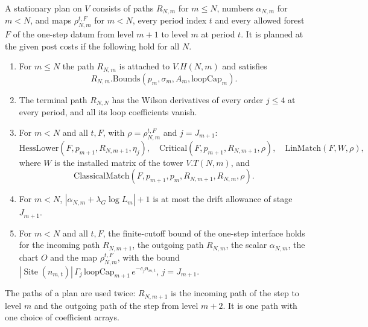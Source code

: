 \begin{definition}
\label{def:path-plan}
A stationary plan on $V$ consists of paths $R_{N,m}$ for $m\le N$,
numbers $\alpha_{N,m}$ for $m<N$, and maps $\rho_{N,m}^{t,F}$ for
$m<N$, every period index $t$ and every allowed forest $F$ of the
one-step datum from level $m+1$ to level $m$ at period $t$. It is
planned at the given post costs if the following hold for all $N$.
\begin{enumerate}
\item For $m\le N$ the path $R_{N,m}$ is attached to $V.H(N,m)$ and
 satisfies
 \[
 R_{N,m}.\mathrm{Bounds}(p_m,\sigma_m,A_m,\mathrm{loopCap}_m).
 \]
\item The terminal path $R_{N,N}$ has the Wilson derivatives of every
 order $j\le4$ at every period, and all its loop coefficients vanish.
\item For $m<N$ and all $t,F$, with $\rho=\rho_{N,m}^{t,F}$ and
 $j=J_{m+1}$:
 \[
 \mathrm{HessLower}(F,p_{m+1},R_{N,m+1},\eta_j),\quad
 \mathrm{Critical}(F,p_{m+1},R_{N,m+1},\rho),\quad
 \mathrm{LinMatch}(F,W,\rho),
 \]
 where $W$ is the installed matrix of the tower $V.T(N,m)$, and
 \[
 \mathrm{ClassicalMatch}(F,p_{m+1},p_m,R_{N,m+1},R_{N,m},\rho).
 \]
\item For $m<N$, $|\alpha_{N,m}+\lambda_G\log L_m|+1$ is at most the
 drift allowance of stage $J_{m+1}$.
\item For $m<N$ and all $t,F$, the finite-cutoff bound of the one-step
 interface holds for the incoming path $R_{N,m+1}$, the outgoing path
 $R_{N,m}$, the scalar $\alpha_{N,m}$, the chart $O$ and the map
 $\rho_{N,m}^{t,F}$, with the bound
 $|\operatorname{Site}(n_{m,t})|\,\Gamma_j\,\mathrm{loopCap}_{m+1}
 \,e^{-c_jn_{m,t}}$, $j=J_{m+1}$.
\end{enumerate}
\end{definition}

The paths of a plan are used twice: $R_{N,m+1}$ is the incoming path of
the step to level $m$ and the outgoing path of the step from level
$m+2$. It is one path with one choice of coefficient arrays.

